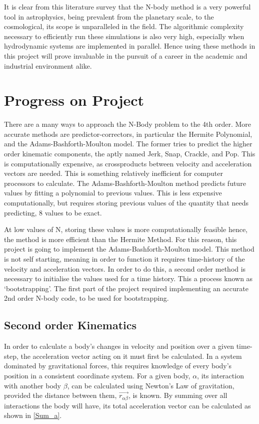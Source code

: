 \documentclass[a4paper,10pt]{article}
\begin{document}
It is clear from this literature survey that the N-body method is a very powerful tool in astrophysics, being prevalent from the planetary scale, to the cosmological, its scope is unparalleled in the field. The algorithmic complexity necessary to efficiently run these simulations is also very high, especially when hydrodynamic systems are implemented in parallel. Hence using these methods in this project will prove invaluable in the pursuit of a career in the academic and industrial environment alike. \pagebreak[4]


\section{Progress on Project}

There are a many ways to approach the N-Body problem to the 4th order. More accurate methods are predictor-correctors, in particular the Hermite Polynomial, and the Adams-Bashforth-Moulton model. The former tries to predict the higher order kinematic components, the aptly named Jerk, Snap, Crackle, and Pop. This is computationally expensive, as crossproducts between velocity and acceleration vectors are needed. This is something relatively inefficient for computer processors to calculate. The Adams-Bashforth-Moulton method predicts future values by fitting a polynomial to previous values. This is less expensive computationally, but requires storing previous values of the quantity that needs predicting, 8 values to be exact. 

At low values of N, storing these values is more computationally feasible hence, the method is more efficient than the Hermite Method. For this reason, this project is going to implement the Adams-Bashforth-Moulton model. This method is not self starting, meaning in order to function it requires time-history of the velocity and acceleration vectors. In order to do this, a second order method is necessary to initialise the values used for a time history. This a process known as `bootstrapping'. The first part of the project required implementing an accurate 2nd order N-body code, to be used for bootstrapping. 

\subsection{Second order Kinematics}

In order to calculate a body's changes in velocity and position over a given time-step, the acceleration vector acting on it must first be calculated. In a system dominated by gravitational forces, this requires knowledge of every body's position in a consistent coordinate system. For a given body, $\alpha$, its interaction with another body $\beta$, can be calculated using Newton's Law of gravitation, provided the distance between them, $\vec{r_{\alpha\beta}}$, is known. By summing over all interactions the body will have, its total acceleration vector can be calculated as shown in \cref{Sum_a}.
\end{document}
